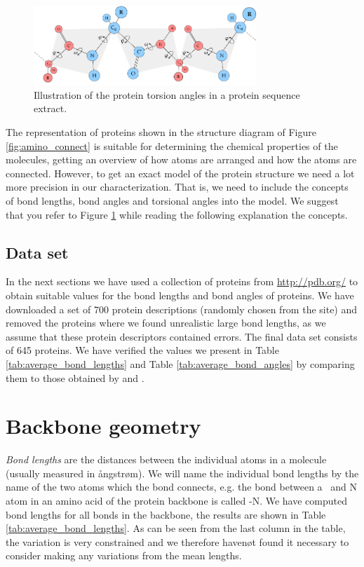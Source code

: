 \begin{figure}
  \centering
  \includegraphics[width=0.75\textwidth]{figures/protein-torsion-angles}
  \caption{Illustration of the protein torsion angles in a protein sequence extract.}
  \label{fig:protein-torsion-angles}
\end{figure}

The representation of proteins shown in the structure diagram of
Figure \ref{fig:amino_connect} is suitable for determining the
chemical properties of the molecules, getting an overview of how atoms
are arranged and how the atoms are connected. However, to get an exact
model of the protein structure we need a lot more precision in our
characterization. That is, we need to include the concepts of bond
lengths, bond angles and torsional angles into the model.  We suggest
that you refer to Figure \ref{fig:protein-torsion-angles} while
reading the following explanation the concepts.

\subsection{Data set}
In the next sections we have used a collection of proteins from
\url{http://pdb.org/} to obtain suitable values for the bond lengths and bond
angles of proteins. We have downloaded a set of 700 protein
descriptions (randomly chosen from the site) and removed the proteins
where we found unrealistic large bond lengths, as we assume that these
protein descriptors contained errors. The final data set consists of
645 proteins. We have verified the values we present in Table
\ref{tab:average_bond_lengths} and Table \ref{tab:average_bond_angles}
by comparing them to those obtained by \cite{probik} and
\cite{laskowski1993main}.

\section{Backbone geometry}
\textit{Bond lengths} are the distances between the individual atoms
in a molecule (usually measured in ångstrøm). We will name the
individual bond lengths by the name of the two atoms which the bond
connects, e.g. the bond between a \Ca\ and N atom in an amino acid of
the protein backbone is called \Ca -N. We have computed bond lengths
for all bonds in the backbone, the results are shown in Table
\ref{tab:average_bond_lengths}. As can be seen from the last column in
the table, the variation is very constrained and we therefore havenøt
found it necessary to consider making any variations from the mean
lengths. 

